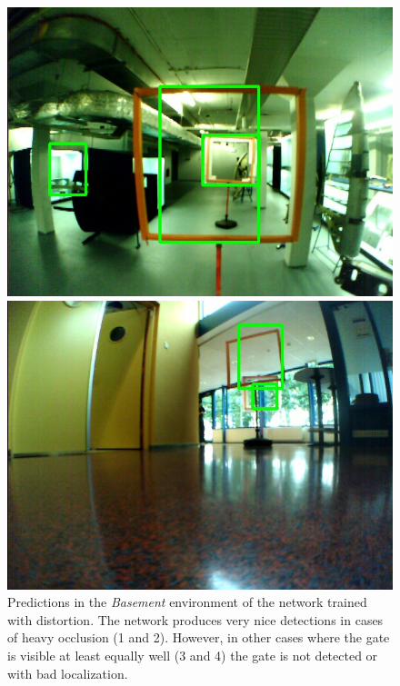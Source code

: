 \begin{figure}[hbtp]
\begin{minipage}{0.24\textwidth}
\end{minipage}
\begin{minipage}{0.24\textwidth}
	\includegraphics[width=\textwidth]{fig/examples/basement_notnice2.jpg}
\end{minipage}
\caption{Predictions in the \textit{Basement} environment of the network trained with distortion. The network produces very nice detections in cases of heavy occlusion (1 and 2). However, in other cases where the gate is visible at least equally well (3 and 4) the gate is not detected or with bad localization.}
\label{fig:example_basement}
\begin{minipage}{0.24\textwidth}
	\includegraphics[width=\textwidth]{fig/examples/hallway_nice1.jpg}

\end{minipage}
\end{figure}
